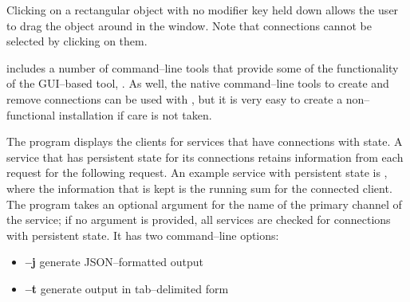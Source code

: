 Clicking on a rectangular object with no modifier key held down allows the user to drag
the object around in the window.
Note that connections cannot be selected by clicking on them.


\secondaryEnd{}

\newpage
{}

\mplusm{} includes a number of command--line tools that provide some of the functionality
of the GUI--based tool, .
As well, the native \yarp{} command--line tools to create and remove connections can be
used with \mplusm{}, but it is very easy to create a non--functional installation if care
is not taken.


The program  displays the clients for services that have
connections with state.
A service that has persistent state for its connections retains information from each
request for the following request.
An example service with persistent state is
, where the information that is kept is the
running sum for the connected client.
The program takes an optional argument for the name of the primary channel of the service;
if no argument is provided, all services are checked for connections with persistent
state.
It has two command--line options:
\begin{itemize}
\item \textbf{--j} generate JSON--formatted output
\item \textbf{--t} generate output in tab--delimited form
\end{itemize}

